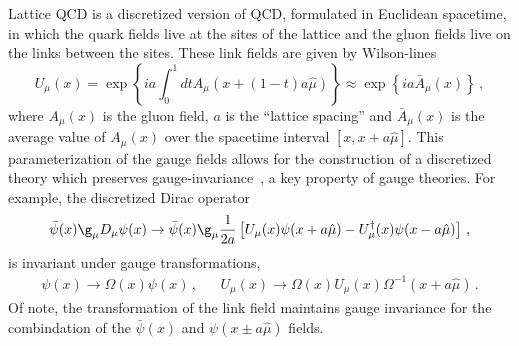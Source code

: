 Lattice QCD is a discretized version of QCD, formulated in Euclidean spacetime, in which the quark fields live at the sites of the lattice and the gluon fields live on the links between the sites.  These link fields are given by Wilson-lines
\begin{equation}
U_\mu(x) = \exp\left\{i a\int_0^1 dt A_\mu(x +(1-t)a\hat{\mu}) \right\}
    \approx \exp\left\{i a \bar{A}_\mu(x) \right\}\, ,
\end{equation}
where $A_\mu(x)$ is the gluon field, $a$ is the ``lattice spacing'' and $\bar{A}_\mu(x)$ is the average value of $A_\mu(x)$ over the spacetime interval $[x, x+a\hat{\mu}]$.
This parameterization of the gauge fields allows for the construction of a discretized theory which preserves gauge-invariance~\cite{Wilson:1974sk}, a key property of gauge theories.
For example, the discretized Dirac operator
\begin{equation}\label{eq:naive_fermions}
\bar{\psi}(x)\g_\mu D_\mu \psi(x) \rightarrow
\bar{\psi}(x)\g_\mu\frac{1}{2a}\left[U_\mu(x)\psi(x+a\hat{\mu}) -U^\dagger_\mu(x)\psi(x-a\hat{\mu}) \right]\, ,
\end{equation}
is invariant under gauge transformations,
\begin{align}
&\psi(x)\rightarrow \Omega(x)\psi(x)\, ,&
&U_\mu(x)\rightarrow \Omega(x)U_\mu(x)\Omega^{-1}(x+a\hat{\mu})\, .&
\end{align}
Of note, the transformation of the link field maintains gauge invariance for the combindation of the $\bar{\psi}(x)$ and $\psi(x\pm a\hat{\mu})$ fields.


